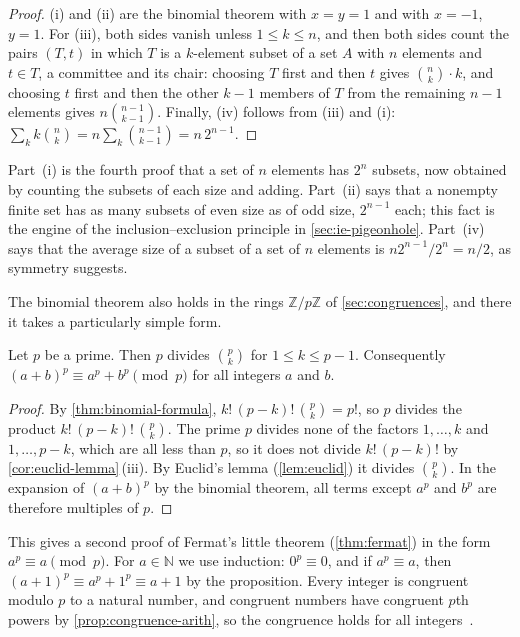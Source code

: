\begin{proof}
(i) and (ii) are the binomial theorem with $x=y=1$ and with $x=-1$, $y=1$. For (iii), both sides vanish unless $1\le k\le n$, and then both sides count the pairs $(T,t)$ in which $T$ is a $k$-element subset of a set $A$ with $n$ elements and $t\in T$, a committee and its chair: choosing $T$ first and then $t$ gives $\binom nk\cdot k$, and choosing $t$ first and then the other $k-1$ members of $T$ from the remaining $n-1$ elements gives $n\binom{n-1}{k-1}$. Finally, (iv) follows from (iii) and (i): $\sum_kk\binom nk=n\sum_k\binom{n-1}{k-1}=n\,2^{n-1}$.
\end{proof}

Part~(i) is the fourth proof that a set of $n$ elements has $2^n$ subsets, now obtained by counting the subsets of each size and adding. Part~(ii) says that a nonempty finite set has as many subsets of even size as of odd size, $2^{n-1}$ each; this fact is the engine of the inclusion--exclusion principle in \cref{sec:ie-pigeonhole}. Part~(iv) says that the average size of a subset of a set of $n$ elements is $n2^{n-1}/2^n=n/2$, as symmetry suggests.

The binomial theorem also holds in the rings $\mathbb Z/p\mathbb Z$ of \cref{sec:congruences}, and there it takes a particularly simple form.

\begin{proposition}
\label{prop:binomial-prime}
Let $p$ be a prime. Then $p$ divides $\binom pk$ for $1\le k\le p-1$. Consequently $(a+b)^p\equiv a^p+b^p\pmod p$ for all integers $a$ and $b$.
\end{proposition}

\begin{proof}
By \cref{thm:binomial-formula}, $k!\,(p-k)!\,\binom pk=p!$, so $p$ divides the product $k!\,(p-k)!\,\binom pk$. The prime $p$ divides none of the factors $1,\ldots,k$ and $1,\ldots,p-k$, which are all less than $p$, so it does not divide $k!\,(p-k)!$ by \cref{cor:euclid-lemma}\,(iii). By Euclid's lemma (\cref{lem:euclid}) it divides $\binom pk$. In the expansion of $(a+b)^p$ by the binomial theorem, all terms except $a^p$ and $b^p$ are therefore multiples of $p$.
\end{proof}

This gives a second proof of Fermat's little theorem (\cref{thm:fermat}) in the form $a^p\equiv a\pmod p$. For $a\in\mathbb N$ we use induction: $0^p\equiv0$, and if $a^p\equiv a$, then $(a+1)^p\equiv a^p+1^p\equiv a+1$ by the proposition. Every integer is congruent modulo $p$ to a natural number, and congruent numbers have congruent $p$th powers by \cref{prop:congruence-arith}, so the congruence holds for all integers~\cite{hardywright2008}.

